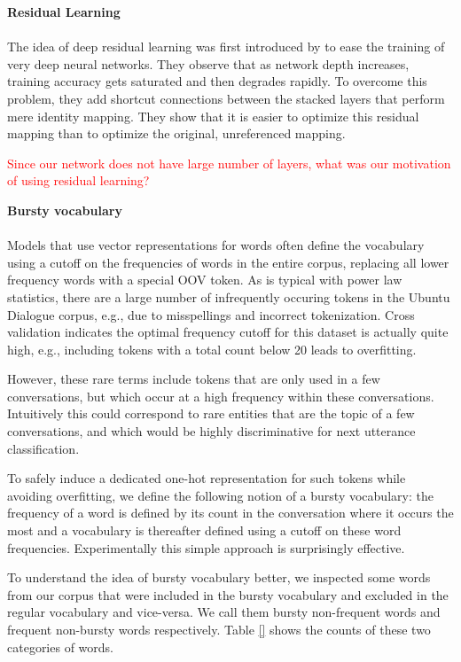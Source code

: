\documentclass[11pt]{article}
\begin{document}
\textbf{Residual Learning} \label{residual_learning}\\\\

The idea of deep residual learning was first introduced by \cite{he2015deep} to ease the training of very deep neural networks. They observe that as network depth increases, training accuracy gets saturated and then degrades rapidly. To overcome this problem, they add shortcut connections between the stacked layers that perform mere identity mapping. They show that it is easier to optimize this residual mapping than to optimize the original, unreferenced mapping.

\textcolor{red}{Since our network does not have large number of layers, what was our motivation of using residual learning?}

\textbf{Bursty vocabulary}\\\\

Models that use vector representations for words often define the
vocabulary using a cutoff on the frequencies of words in the entire
corpus, replacing all lower frequency words with a special OOV token.
As is typical with power law statistics, there are a large number of
infrequently occuring tokens in the Ubuntu Dialogue corpus, e.g., due
to misspellings and incorrect tokenization.  Cross validation indicates
the optimal frequency cutoff for this dataset is actually quite high,
e.g., including tokens with a total count below 20 leads to overfitting.

However, these rare terms include tokens that are only used in a
few conversations, but which occur at a high frequency within 
these conversations.  Intuitively this could correspond to rare entities
that are the topic of a few conversations, and which would be 
highly discriminative for next utterance classification.

To safely induce a dedicated one-hot representation for such tokens
while avoiding overfitting, we define the following notion of a bursty
vocabulary: the frequency of a word is defined by its count in the
conversation where it occurs the most and a vocabulary is thereafter
defined using a cutoff on these word frequencies.  Experimentally
this simple approach is surprisingly effective.

To understand the idea of bursty vocabulary better, we inspected some
words from our corpus that were included in the bursty vocabulary and
excluded in the regular vocabulary and vice-versa. We call them bursty
non-frequent words and frequent non-bursty words respectively. Table
\ref{} shows the counts of these two categories of words. 
\end{document}
